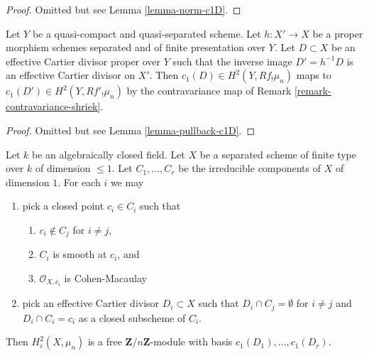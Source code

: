 \begin{proof}
Omitted but see Lemma \ref{lemma-norm-c1D}.
\end{proof}

\begin{lemma}
\label{lemma-proper-contravariance-c1D}
Let $Y$ be a quasi-compact and quasi-separated scheme.
Let $h : X' \to X$ be a proper morphism
schemes separated and of finite presentation over $Y$.
Let $D \subset X$ be an effective Cartier divisor
proper over $Y$ such that the inverse image $D' = h^{-1}D$
is an effective Cartier divisor on $X'$.
Then $c_1(D) \in H^2(Y, Rf_!\mu_n)$ maps to
$c_1(D') \in H^2(Y, Rf'_!\mu_n)$ by the contravariance map
of Remark \ref{remark-contravariance-shriek}.
\end{lemma}

\begin{proof}
Omitted but see Lemma \ref{lemma-pullback-c1D}.
\end{proof}

\begin{lemma}
\label{lemma-generation-by-c1}
Let $k$ be an algebraically closed field. Let $X$ be a separated
scheme of finite type over $k$ of dimension $\leq 1$. Let
$C_1, \ldots, C_r$ be the irreducible components of $X$ of dimension $1$.
For each $i$ we may
\begin{enumerate}
\item pick a closed point $c_i \in C_i$ such that
\begin{enumerate}
\item $c_i \not \in C_j$ for $i \not = j$,
\item $C_i$ is smooth at $c_i$, and
\item $\mathcal{O}_{X, c_i}$ is Cohen-Macaulay
\end{enumerate}
\item pick an effective Cartier divisor $D_i \subset X$ such that
$D_i \cap C_j = \emptyset$ for $i \not = j$ and $D_i \cap C_i = c_i$
as a closed subscheme of $C_i$.
\end{enumerate}
Then $H^2_c(X, \mu_n)$ is a free $\mathbf{Z}/n\mathbf{Z}$-module
with basis $c_1(D_1), \ldots, c_1(D_r)$.
\end{lemma}

